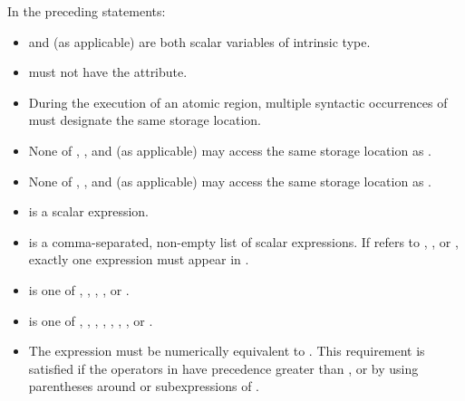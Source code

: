 {{{{\begin{quote}



\end{quote}

In the preceding statements:

\begin{itemize}
\item {} and  (as applicable) are both scalar variables of intrinsic type.

\item {} must not have the  attribute.

\item During the execution of an atomic region, multiple syntactic occurrences of  must 
designate the same storage location.

\item None of , , and  (as applicable) may access the same storage location as 
. 

\item None of , , and  (as applicable) may access the same storage location as 
.

\item {} is a scalar expression.

\item {} is a comma-separated, non-empty list of scalar expressions. If 
 refers to , , or , exactly one expression 
must appear in .

\item {} is one of , , , , or .

\item {} is one of \code{+}, \code{*}, \code{-}, \code{/}, , , , or .

\item The expression  must be numerically equivalent to . 
This requirement is satisfied if the operators in  have precedence greater than 
, or by using parentheses around  or subexpressions of .


\end{itemize}}}}}
